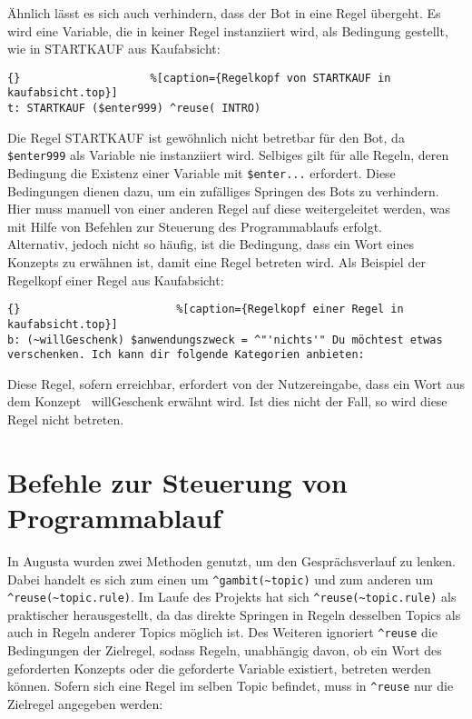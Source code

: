 Ähnlich lässt es sich auch verhindern, dass der Bot in eine Regel übergeht. Es wird eine Variable, die in keiner Regel instanziiert wird, als Bedingung gestellt, wie in STARTKAUF aus Kaufabsicht: 

\begin{lstlisting}{}					%[caption={Regelkopf von STARTKAUF in kaufabsicht.top}]
t: STARTKAUF ($enter999) ^reuse( INTRO)
\end{lstlisting}

Die Regel STARTKAUF ist gewöhnlich nicht betretbar für den Bot, da \lstinline|$enter999| als Variable nie instanziiert wird. Selbiges gilt für alle Regeln, deren Bedingung die Existenz einer Variable mit \lstinline|$enter...| erfordert. Diese Bedingungen dienen dazu, um ein zufälliges Springen des Bots zu verhindern. Hier muss manuell von einer anderen Regel auf diese weitergeleitet werden, was mit Hilfe von Befehlen zur Steuerung des Programmablaufs erfolgt.\\

Alternativ, jedoch nicht so häufig, ist die Bedingung, dass ein Wort eines Konzepts zu erwähnen ist, damit eine Regel betreten wird. Als Beispiel der Regelkopf einer Regel aus Kaufabsicht:

\begin{lstlisting}{}						%[caption={Regelkopf einer Regel in kaufabsicht.top}]
b: (~willGeschenk) $anwendungszweck = ^"'nichts'" Du möchtest etwas verschenken. Ich kann dir folgende Kategorien anbieten:
\end{lstlisting}

Diese Regel, sofern erreichbar, erfordert von der Nutzereingabe, dass ein Wort aus dem Konzept ~willGeschenk erwähnt wird. Ist dies nicht der Fall, so wird  diese Regel nicht betreten.\\


\section{Befehle zur Steuerung von Programmablauf}
\label{sec:ChatScript: Befehle zur Steuerung von Programmablauf}

In Augusta wurden zwei Methoden genutzt, um den Gesprächsverlauf zu lenken. Dabei handelt es sich zum einen um \lstinline|^gambit(~topic)| und zum anderen um \lstinline|^reuse(~topic.rule)|. Im Laufe des Projekts hat sich \lstinline|^reuse(~topic.rule)| als praktischer herausgestellt, da das direkte Springen in Regeln desselben Topics als auch in Regeln anderer Topics möglich ist. Des Weiteren ignoriert \lstinline|^reuse| die Bedingungen der Zielregel, sodass Regeln, unabhängig davon, ob ein Wort des geforderten Konzepts oder die geforderte Variable existiert, betreten werden können. Sofern sich eine Regel im selben Topic befindet, muss in \lstinline|^reuse| nur die Zielregel angegeben werden:

